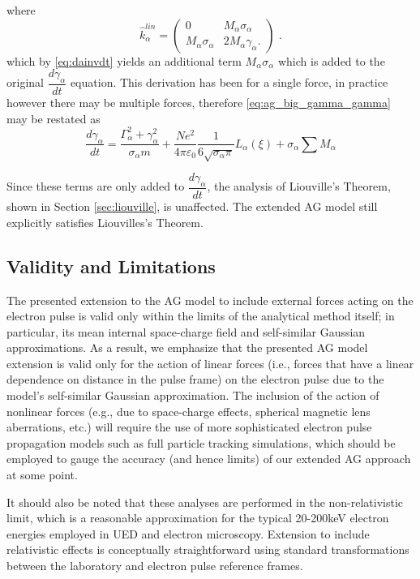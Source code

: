 where
\begin{equation}
\hat{k}^{lin}_{\alpha} =
\begin{pmatrix}
0 & M_{\alpha} \sigma_{\alpha} \\
M_{\alpha} \sigma_{\alpha} & 2 M_{\alpha} \gamma_{\alpha} \text{.}
\end{pmatrix} \text{ .}
\end{equation}
which by \ref{eq:dainvdt} yields an additional term $M_{\alpha} \sigma_{\alpha}$ which is added to the original $\dfrac{d \gamma_{\alpha}}{d t}$ equation.
This derivation has been for a single force, in practice however there may be multiple forces, therefore \ref{eq:ag_big_gamma_gamma} may be restated as
\begin{equation}
  \frac{d\gamma_{\alpha}}{dt} = \frac{ \Gamma_{\alpha}^2 + \gamma_{\alpha}^2 }{\sigma_{\alpha} m}
    + \frac{N e^2}{4\pi\varepsilon_0} \frac{1}{6 \sqrt{\sigma_{\alpha}\pi}} L_{\alpha}(\xi) + \sigma_{\alpha} \sum M_{\alpha} 
\end{equation}

Since these terms are only added to $\dfrac{d \gamma_{\alpha}}{d t}$, the analysis of Liouville's Theorem, shown in Section \ref{sec:liouville}, is unaffected.
The extended AG model still explicitly satisfies Liouvilles's Theorem.

\subsection{Validity and Limitations}

The presented extension to the AG model to include external forces acting on the electron pulse is valid only within the limits of the analytical method itself; in particular, its mean internal space-charge field and self-similar Gaussian approximations.\cite{michalik_analytic_2006}
As a result, we emphasize that the presented AG model extension is valid only for the action of linear forces (i.e., forces that have a linear dependence on distance in the pulse frame) on the electron pulse due to the model's self-similar Gaussian approximation.
The inclusion of the action of nonlinear forces (e.g., due to space-charge effects, spherical magnetic lens aberrations, etc.) will require the use of more sophisticated electron pulse propagation models such as full particle tracking simulations, which should be employed to gauge the accuracy (and hence limits) of our extended AG approach at some point.

It should also be noted that these analyses are performed in the non-relativistic limit, which is a reasonable approximation for the typical 20-200keV electron energies employed in UED and electron microscopy.
Extension to include relativistic effects is conceptually straightforward using standard transformations between the laboratory and electron pulse reference frames.

